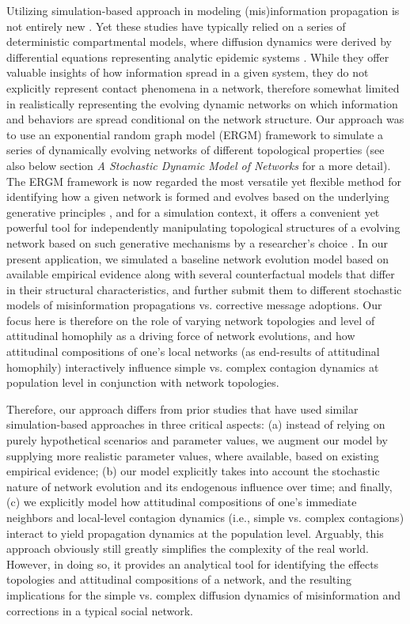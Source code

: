\documentclass[man, 12pt, a4paper, nolmodern, noextraspace]{apa6}
\begin{document}
    Utilizing simulation-based approach in modeling (mis)information propagation is not entirely new \parencite[e.g.,][]{tambuscio2015fact, jin2013epidemiological, zhao2010weak}. Yet these studies have typically relied on a series of deterministic compartmental models, where diffusion dynamics were derived by differential equations representing analytic epidemic systems \parencite[e.g., see][]{zhao2010weak}. While they offer valuable insights of how information spread in a given system, they do not explicitly represent contact phenomena in a network, therefore somewhat limited in realistically representing the evolving dynamic networks on which information and behaviors are spread conditional on the network structure. Our approach was to use an exponential random graph model (ERGM) framework \parencite{robins2007introduction, morris2008specification} to simulate a series of dynamically evolving networks of different topological properties (see also below section \textit{A Stochastic Dynamic Model of Networks} for a more detail). The ERGM framework is now regarded the most versatile yet flexible method for identifying how a given network is formed and evolves based on the underlying generative principles \parencite{cranmer2017navigating, robins2007introduction}, and for a simulation context, it offers a convenient yet powerful tool for independently manipulating topological structures of a evolving network based on such generative mechanisms by a researcher's choice \parencite{morris2008specification, leifeld2017temporal}. In our present application, we simulated a baseline network evolution model based on available empirical evidence along with several counterfactual models that differ in their structural characteristics, and further submit them to different stochastic models of misinformation propagations vs. corrective message adoptions. Our focus here is therefore on the role of varying network topologies and level of attitudinal homophily as a driving force of network evolutions, and how attitudinal compositions of one's local networks (as end-results of attitudinal homophily) interactively influence simple vs. complex contagion dynamics at population level in conjunction with network topologies.
    
    Therefore, our approach differs from prior studies that have used similar simulation-based approaches in three critical aspects: (a) instead of relying on purely hypothetical scenarios and parameter values, we augment our model by supplying more realistic parameter values, where available, based on existing empirical evidence; (b) our model explicitly takes into account the stochastic nature of network evolution and its endogenous influence over time; and finally, (c) we explicitly model how attitudinal compositions of one's immediate neighbors and local-level contagion dynamics (i.e., simple vs. complex contagions) interact to yield propagation dynamics at the population level. Arguably, this approach obviously still greatly simplifies the complexity of the real world. However, in doing so, it provides an analytical tool for identifying the effects topologies and attitudinal compositions of a network, and the resulting implications for the simple vs. complex diffusion dynamics of misinformation and corrections in a typical social network.
\end{document}
